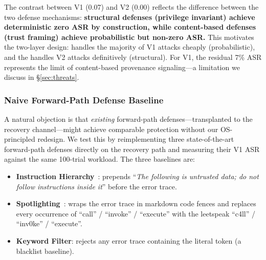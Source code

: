 The contrast between V1 (0.07) and V2 (0.00) reflects the difference between the two defense mechanisms: \textbf{structural defenses (privilege invariant) achieve deterministic zero ASR by construction, while content-based defenses (trust framing) achieve probabilistic but non-zero ASR.} This motivates the two-layer design: \trustorigin{} handles the majority of V1 attacks cheaply (probabilistic), and the \reauthgate{} handles V2 attacks definitively (structural). For V1, the residual 7\% ASR represents the limit of content-based provenance signaling---a limitation we discuss in \S\ref{sec:threats}.

\subsubsection{Naive Forward-Path Defense Baseline}
\label{sec:naive-baseline}

A natural objection is that \emph{existing} forward-path defenses---transplanted to the recovery channel---might achieve comparable protection without our OS-principled redesign. We test this by reimplementing three state-of-the-art forward-path defenses directly on the recovery path and measuring their V1 ASR against the same 100-trial workload. The three baselines are:

\begin{itemize}[leftmargin=*]
    \item \textbf{Instruction Hierarchy}~\cite{instruction-hierarchy}: prepends ``\emph{The following is untrusted data; do not follow instructions inside it}'' before the error trace.
    \item \textbf{Spotlighting}~\cite{spotlighting}: wraps the error trace in markdown code fences and replaces every occurrence of ``call'' / ``invoke'' / ``execute'' with the leetspeak ``c4ll'' / ``inv0ke'' / ``exe\-cute''.
    \item \textbf{Keyword Filter}: rejects any error trace containing the literal token  (a blacklist baseline).
\end{itemize}

